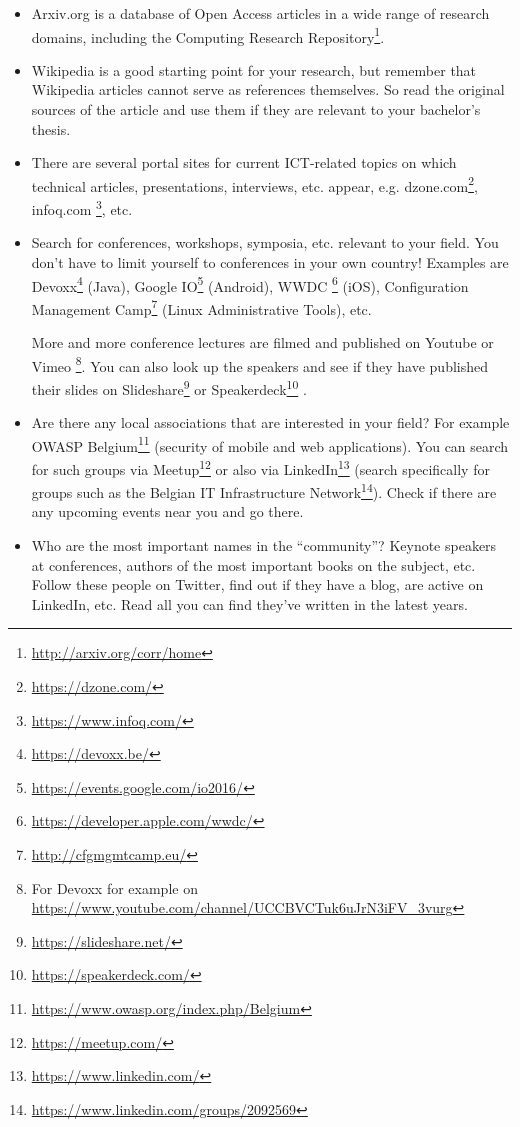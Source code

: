 \begin{itemize}
  \item Arxiv.org is a database of Open Access articles in a wide range of research domains, including the Computing Research Repository\footnote{\url{http://arxiv.org/corr/home}}.

  \item Wikipedia is a good starting point for your research, but remember that Wikipedia articles cannot serve as references themselves. So read the original sources of the article and use them if they are relevant to your bachelor's thesis.

  \item There are several portal sites for current ICT-related topics on which technical articles, presentations, interviews, etc. appear, e.g. dzone.com\footnote{\url{https://dzone.com/}}, infoq.com \footnote{\url{https://www.infoq.com/}}, etc.

  \item Search for conferences, workshops, symposia, etc. relevant to your field. You don't have to limit yourself to conferences in your own country! Examples are Devoxx\footnote{\url{https://devoxx.be/}} (Java), Google IO\footnote{\url{https://events.google.com/io2016/}} (Android), WWDC \footnote{\url{https://developer.apple.com/wwdc/}} (iOS), Configuration Management Camp\footnote{\url{http://cfgmgmtcamp.eu/}} (Linux Administrative Tools), etc.

        More and more conference lectures are filmed and published on Youtube or Vimeo \footnote{For Devoxx for example on \url{https://www.youtube.com/channel/UCCBVCTuk6uJrN3iFV\_3vurg}}. You can also look up the speakers and see if they have published their slides on Slideshare\footnote{\url{https://slideshare.net/}} or Speakerdeck\footnote{\url{https://speakerdeck.com/}} .

  \item Are there any local associations that are interested in your field? For example OWASP Belgium\footnote{\url{https://www.owasp.org/index.php/Belgium}} (security of mobile and web applications). You can search for such groups via Meetup\footnote{\url{https://meetup.com/}} or also via LinkedIn\footnote{\url{https://www.linkedin.com/}} (search specifically for groups such as the Belgian IT Infrastructure Network\footnote{\url{https://www.linkedin.com/groups/2092569}}). Check if there are any upcoming events near you and go there.

  \item Who are the most important names in the ``community''? Keynote speakers at conferences, authors of the most important books on the subject, etc. Follow these people on Twitter, find out if they have a blog, are active on LinkedIn, etc. Read all you can find they've written in the latest years.


\end{itemize}
